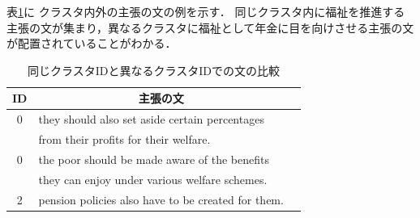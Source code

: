 \documentclass[a4paper, twocolumn, 10pt]{jarticle}
\begin{document}


表\ref{classification_result_samples}に
クラスタ内外の主張の文の例を示す．
同じクラスタ内に福祉を推進する主張の文が集まり，異なるクラスタに福祉として年金に目を向けさせる主張の文が配置されていることがわかる．

\begin{table}[H]
  \caption{
      同じクラスタIDと異なるクラスタIDでの文の比較
    }
  \centering
  {\tabcolsep=0.05cm
    \begin{tabular}{clp{6cm}}
    \hline
    ID & \multicolumn{1}{c}{主張の文}
    \\
    \hline
    0 & they should also set aside certain percentages
    \\
    & from their profits for their welfare.
    \\
    0 & the poor should be made aware of the benefits
    \\
    & they can enjoy under various welfare schemes.
    \\
    2 & pension policies also have to be created for them.
    \\
    \hline
    \end{tabular}
  }
  \label{classification_result_samples}
\end{table}
\end{document}
